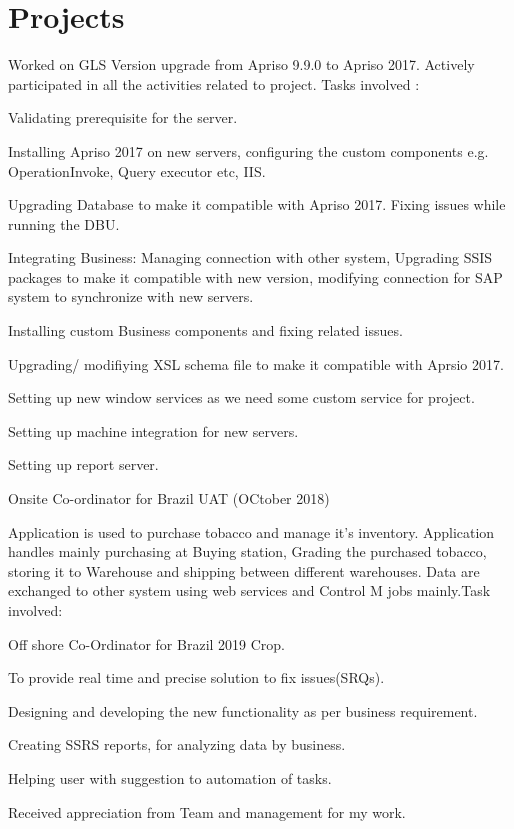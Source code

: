 \documentclass[]{deedy-resume-openfont}
\begin{document}
\begin{minipage}[t]{0.66\textwidth}
\section{Projects}
Worked on GLS Version upgrade from Apriso 9.9.0 to Apriso 2017. Actively participated in all the activities related to project. Tasks involved :
\begin{tightemize}
\item Validating prerequisite for the server.
\item Installing Apriso 2017 on new servers, configuring the custom components e.g. OperationInvoke, Query executor etc, IIS.
\item Upgrading Database to make it compatible with Apriso 2017. Fixing issues while running the DBU.
\item Integrating Business: Managing connection with other system, Upgrading SSIS packages to make it compatible with new version, modifying connection for SAP system to synchronize with new servers.
\item Installing custom Business components and fixing related issues.
\item Upgrading/ modifiying XSL schema file to make it compatible with Aprsio 2017.
\item Setting up new window services as we need some custom service for project.
\item Setting up machine integration for new servers.
\item Setting up report server.
\item Onsite Co-ordinator for Brazil UAT (OCtober 2018)
\end{tightemize}

\sectionsep
{}
Application is used to purchase tobacco and manage it's inventory. Application handles mainly purchasing at Buying station, Grading the purchased tobacco, storing it to Warehouse and shipping between different warehouses. Data are exchanged to other system using web services and Control M jobs mainly.Task involved:
\begin{tightemize}
\item  Off shore Co-Ordinator for Brazil 2019 Crop.
\item To provide real time and precise solution to fix issues(SRQs). 
\item Designing and developing the  new functionality as per business requirement.
\item Creating SSRS reports, for analyzing data by business.
\item  Helping user with suggestion to automation  of tasks.
\item Received appreciation from Team and management for my  work.
\end{tightemize}
\sectionsep 
\end{minipage} 
\end{document}
